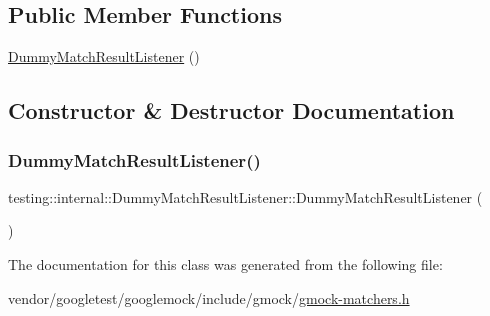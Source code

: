 \subsection*{Public Member Functions}
\begin{DoxyCompactItemize}
\item 
\hyperlink{classtesting_1_1internal_1_1_dummy_match_result_listener_a3284ab25167628be9a92e4ee5d2042fe}{Dummy\+Match\+Result\+Listener} ()
\end{DoxyCompactItemize}


\subsection{Constructor \& Destructor Documentation}
\mbox{\label{classtesting_1_1internal_1_1_dummy_match_result_listener_a3284ab25167628be9a92e4ee5d2042fe}} 
\subsubsection{\texorpdfstring{Dummy\+Match\+Result\+Listener()}{DummyMatchResultListener()}}
{\footnotesize\ttfamily testing\+::internal\+::\+Dummy\+Match\+Result\+Listener\+::\+Dummy\+Match\+Result\+Listener (\begin{DoxyParamCaption}{ }\end{DoxyParamCaption})\hspace{0.3cm}{\ttfamily [inline]}}



The documentation for this class was generated from the following file\+:\begin{DoxyCompactItemize}
\item 
vendor/googletest/googlemock/include/gmock/\hyperlink{gmock-matchers_8h}{gmock-\/matchers.\+h}\end{DoxyCompactItemize}
